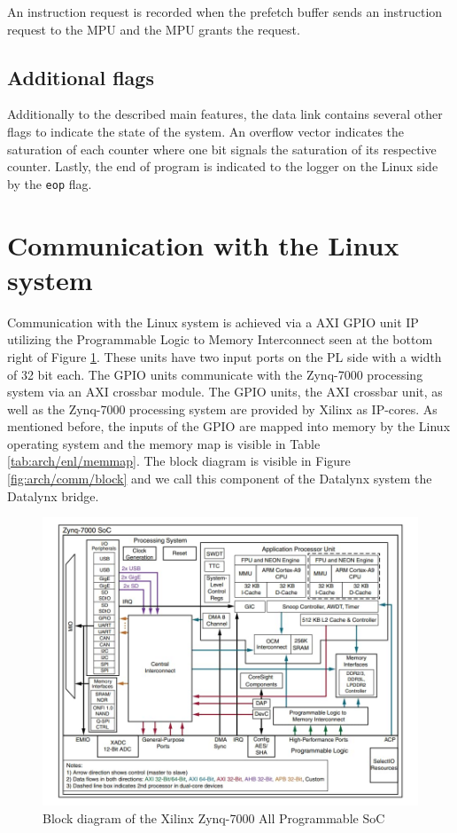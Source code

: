 \documentclass[../bachelor_paper.tex]{subfiles}
\begin{document}
An instruction request is recorded when the prefetch buffer sends an instruction request to the \ac{MPU} and the \ac{MPU} grants the request.

\subsection{Additional flags}
Additionally to the described main features, the data link contains several other flags to indicate the state of the system. An overflow vector indicates the saturation of each counter where one bit signals the saturation of its respective counter. Lastly, the end of program is indicated to the logger on the Linux side by the \texttt{eop} flag.

\section{Communication with the Linux system}
Communication with the Linux system is achieved via a AXI GPIO unit \ac{IP} utilizing the Programmable Logic to Memory Interconnect seen at the bottom right of Figure \ref{fig:arch/comm/zynq}. These units have two input ports on the \ac{PL} side with a width of 32 bit each. The GPIO units communicate with the Zynq-7000 processing system via an AXI crossbar module. The GPIO units, the AXI crossbar unit, as well as the Zynq-7000 processing system are provided by Xilinx as \ac{IP}-cores. As mentioned before, the inputs of the GPIO are mapped into memory by the Linux operating system and the memory map is visible in Table \ref{tab:arch/enl/memmap}. The block diagram is visible in Figure \ref{fig:arch/comm/block} and we call this component of the Datalynx system the Datalynx bridge.

\begin{figure}
    \centering
    \includegraphics[width=1\columnwidth]{img/zynq_block}
    \caption{Block diagram of the Xilinx Zynq-7000 All Programmable \ac{SoC}}
    \label{fig:arch/comm/zynq}
\end{figure}
\end{document}
